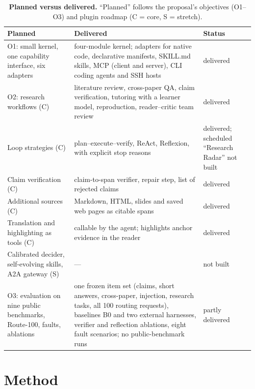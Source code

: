 \documentclass{article}
\begin{document}
\begin{table}[h]
  \caption{\textbf{Planned versus delivered.} ``Planned'' follows the proposal's objectives (O1--O3) and plugin roadmap (C = core, S = stretch).}
  \label{tab:continuity}
  \centering\scriptsize
  \begin{tabularx}{\textwidth}{@{}>{\raggedright\arraybackslash}p{3.6cm}>{\raggedright\arraybackslash}X>{\raggedright\arraybackslash}p{2.3cm}@{}}
    \toprule
    \textbf{Planned} & \textbf{Delivered} & \textbf{Status} \\
    \midrule
    O1: small kernel, one capability interface, six adapters & four-module kernel; adapters for native code, declarative manifests, SKILL.md skills, MCP (client and server), CLI coding agents and SSH hosts & delivered \\
    O2: research workflows (C) & literature review, cross-paper QA, claim verification, tutoring with a learner model, reproduction, reader--critic team review & delivered \\
    Loop strategies (C) & plan--execute--verify, ReAct, Reflexion, with explicit stop reasons & delivered; scheduled ``Research Radar'' not built \\
    Claim verification (C) & claim-to-span verifier, repair step, list of rejected claims & delivered \\
    Additional sources (C) & Markdown, HTML, slides and saved web pages as citable spans & delivered \\
    Translation and highlighting as tools (C) & callable by the agent; highlights anchor evidence in the reader & delivered \\
    Calibrated decider, self-evolving skills, A2A gateway (S) & --- & not built \\
    O3: evaluation on nine public benchmarks, Route-100, faults, ablations & one frozen item set (claims, short answers, cross-paper, injection, research tasks, all 100 routing requests), baselines B0 and two external harnesses, verifier and reflection ablations, eight fault scenarios; no public-benchmark runs & partly delivered \\
    \bottomrule
  \end{tabularx}
\end{table}

\section{Method}
\label{sec:method}
\end{document}
